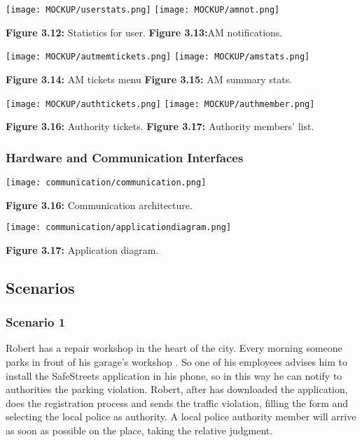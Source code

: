 \documentclass[12pt]{article}
\begin{document}
  \texttt{[image: MOCKUP/userstats.png]}                  \hfill \texttt{[image: MOCKUP/amnot.png]}
		 
		 \textbf{Figure 3.12:} Statistics for user.  \hfill \textbf{Figure 3.13:}AM notifications.


\newpage
 	 \texttt{[image: MOCKUP/autmemtickets.png]}                  \hfill \texttt{[image: MOCKUP/amstats.png]}
		 
		 \textbf{Figure 3.14:} AM tickets menu   \hfill \textbf{Figure 3.15:} AM summary stats.
		
  \texttt{[image: MOCKUP/authtickets.png]}                  \hfill \texttt{[image: MOCKUP/authmember.png]}
		 
		 \textbf{Figure 3.16:} Authority tickets.  \hfill \textbf{Figure 3.17:} Authority members' list.


\subsubsection{Hardware and Communication Interfaces}
\vspace{5mm}
\begin{center}
\texttt{[image: communication/communication.png]}                 

\textbf{Figure 3.16:} Communication architecture. 
\end{center}

\begin{center}
\texttt{[image: communication/applicationdiagram.png]}                 

\textbf{Figure 3.17:} Application diagram. 
\end{center}

\newpage

\subsection{Scenarios}
\subsubsection{Scenario 1}
\vspace{2mm}
Robert has a repair workshop in the heart of the city. Every morning someone parks in front of his garage’s workshop . So one of his employees advises him to install the SafeStreets application in his phone, so in this way he can notify to authorities the parking violation. Robert, after has downloaded the application, does the registration process and sends the traffic violation, filling the form and selecting the local police as authority. A local police authority member will arrive as soon as possible on the place, taking the relative judgment.
\end{document}
